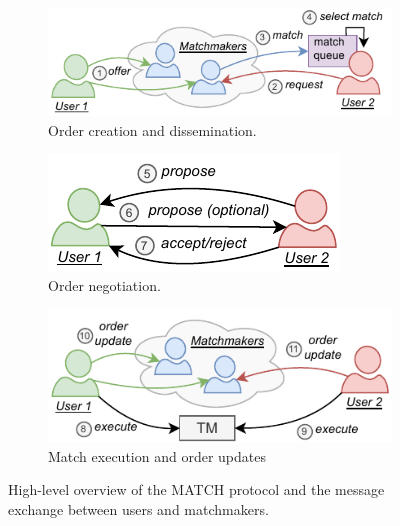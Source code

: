 
\begin{figure}[t]
	\centering
	\begin{subfigure}{.7\columnwidth}
		\centering
		\includegraphics[width=\linewidth]{match/assets/matching_protocol_1}
		\caption{Order creation and dissemination.}
		\label{fig:matching_protocol_1}
	\end{subfigure}
	\begin{subfigure}{.5\columnwidth}
		\centering
		\includegraphics[width=\columnwidth]{match/assets/matching_protocol_2}
		\caption{Order negotiation.}
		\label{fig:matching_protocol_2}
	\end{subfigure}
	\begin{subfigure}{.7\columnwidth}
		\centering
		\includegraphics[width=\columnwidth]{match/assets/matching_protocol_3}
		\caption{Match execution and order updates}
		\label{fig:matching_protocol_3}
	\end{subfigure}
	\caption{High-level overview of the MATCH protocol and the message exchange between users and matchmakers.}
	\label{fig:match_data_flow}
\end{figure}

